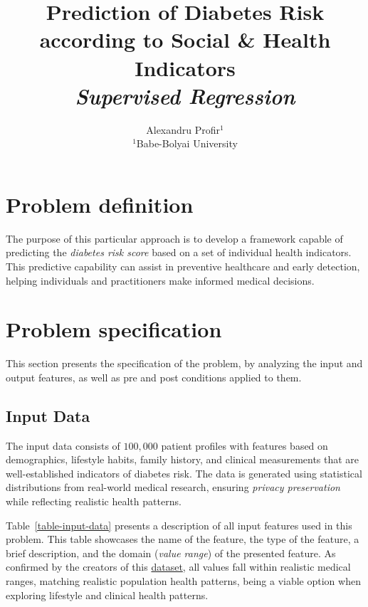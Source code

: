 \documentclass[a4paper]{article}
\title{
	Prediction of Diabetes Risk according to Social \& Health Indicators \\
	\large \textit{Supervised Regression}
}
\author{Alexandru Profir$^{1}$ \\
        \small $^{1}$Babe\cb{s}-Bolyai University
}
\begin{document}
\maketitle
\hspace{10pt}

\section{Problem definition}

\par The purpose of this particular approach is to develop a framework capable of predicting the \textit{diabetes risk score} based on a set of individual health indicators. This predictive capability can assist in preventive healthcare and early detection, helping individuals and practitioners make informed medical decisions.

\section{Problem specification}

\par This section presents the specification of the problem, by analyzing the input and output features, as well as pre and post conditions applied to them.

\subsection{Input Data}

\par The input data consists of $100,000$ patient profiles with features based on demographics, lifestyle habits, family history, and clinical measurements that are well-established indicators of diabetes risk. The data is generated using statistical distributions from real-world medical research, ensuring \textit{privacy preservation} while reflecting realistic health patterns.

\par Table~\ref{table-input-data} presents a description of all input features used in this problem. This table showcases the name of the feature, the type of the feature, a brief description, and the domain (\textit{value range}) of the presented feature. As confirmed by the creators of this \href{https://www.kaggle.com/datasets/mohankrishnathalla/diabetes-health-indicators-dataset}{dataset}, all values fall within realistic medical ranges, matching realistic population health patterns, being a viable option when exploring lifestyle and clinical health patterns.
\end{document}

